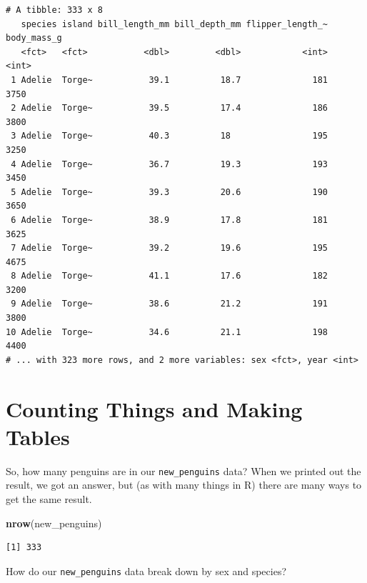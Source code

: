 \documentclass[
]{book}
\newenvironment{Shaded}{\begin{snugshade}}{\end{snugshade}}
\newcommand{\CommentTok}[1]{\textcolor[rgb]{0.56,0.35,0.01}{\textit{#1}}}
\newcommand{\KeywordTok}[1]{\textcolor[rgb]{0.13,0.29,0.53}{\textbf{#1}}}
\newcommand{\NormalTok}[1]{#1}
\newcommand{\OperatorTok}[1]{\textcolor[rgb]{0.81,0.36,0.00}{\textbf{#1}}}
\newcommand{\StringTok}[1]{\textcolor[rgb]{0.31,0.60,0.02}{#1}}
\begin{document}
\begin{verbatim}
# A tibble: 333 x 8
   species island bill_length_mm bill_depth_mm flipper_length_~ body_mass_g
   <fct>   <fct>           <dbl>         <dbl>            <int>       <int>
 1 Adelie  Torge~           39.1          18.7              181        3750
 2 Adelie  Torge~           39.5          17.4              186        3800
 3 Adelie  Torge~           40.3          18                195        3250
 4 Adelie  Torge~           36.7          19.3              193        3450
 5 Adelie  Torge~           39.3          20.6              190        3650
 6 Adelie  Torge~           38.9          17.8              181        3625
 7 Adelie  Torge~           39.2          19.6              195        4675
 8 Adelie  Torge~           41.1          17.6              182        3200
 9 Adelie  Torge~           38.6          21.2              191        3800
10 Adelie  Torge~           34.6          21.1              198        4400
# ... with 323 more rows, and 2 more variables: sex <fct>, year <int>
\end{verbatim}

\hypertarget{counting-things-and-making-tables}{%
\section{Counting Things and Making Tables}\label{counting-things-and-making-tables}}

So, how many penguins are in our \texttt{new\_penguins} data? When we printed out the result, we got an answer, but (as with many things in R) there are many ways to get the same result.

\begin{Shaded}
\begin{Highlighting}[]
\KeywordTok{nrow}\NormalTok{(new_penguins)}
\end{Highlighting}
\end{Shaded}

\begin{verbatim}
[1] 333
\end{verbatim}

How do our \texttt{new\_penguins} data break down by sex and species?

\begin{Shaded}
\end{Shaded}
\end{document}
